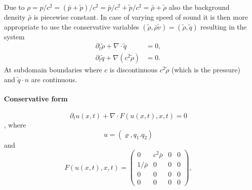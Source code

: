 \documentclass[a4paper,12pt]{article}
\theoremstyle{definition}
\theoremstyle{definition}
\begin{document}
Due to $\rho = p/c^2 = (\bar{p} + \tilde{p})/c^2 = \bar{p}/c^2 +\tilde{p}/c^2 = \bar\rho + \tilde\rho$
also the background density $\bar\rho$ is piecewise constant. In case of varying speed of sound
it is then more appropriate to use the conservative variables $(\tilde\rho, \bar{\rho} \tilde{v}) = (\tilde\rho,\tilde{q})$
resulting in the system
\begin{subequations}\label{eq:LinearAcousticsConservative}
\begin{align}
\partial_t \tilde{\rho} +  \nabla\cdot\tilde{q} &= 0,\\
\partial_t \tilde{q} + \nabla (c^2\tilde{\rho}) &= 0.
\end{align}
\end{subequations}
At subdomain boundaries where $c$ is discontinuous $c^2\tilde\rho$
(which is the pressure) and $\tilde{q}\cdot n$ are continuous.

\paragraph{Conservative form}
$$\partial_t u(x,t) + \nabla\cdot F(u(x,t),x,t) = 0$$ ,
where 
$$u = (\varrho,q_1.q_2) $$
and 
$$F(u(x,t),x,t) = \left( \begin{smallmatrix}
0  & c^2\bar\rho & 0 & 0\\
1/\bar\rho & 0 & 0 & 0\\
0 & 0 & 0 & 0\\
0 & 0 & 0 & 0
\end{smallmatrix} \right), $$
\end{document}

